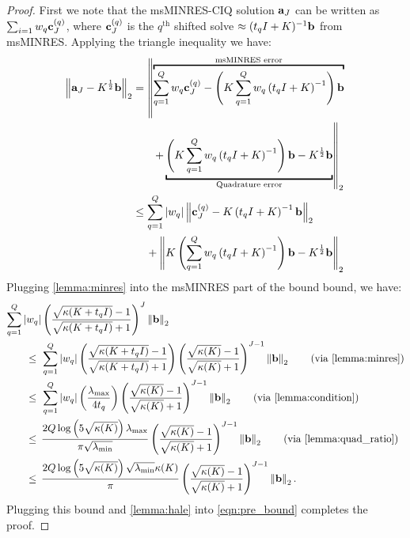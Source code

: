 \begin{proof}
  First we note that the msMINRES-CIQ solution $\mathbf{a}_J$ can be written as $\sum_{i=1} w_q \mathbf{c}^{(q)}_J$, where $\mathbf{c}^{(q)}_J$ is the $q^\text{th}$ shifted solve $\approx (t_q I + K)^{-1} \mathbf{b}$ from msMINRES.
  Applying the triangle inequality we have:
  \begin{align}
    \left\Vert \ba_J - \bK^{\frac 1 2} \bb \right\Vert_2
    &=
    \left\Vert \overbracket{\sum_{q=1}^Q w_q \bc^{(q)}_J - \left( \bK \sum_{q=1}^Q w_q \left( t_q \bI + \bK \right)^{-1} \right) \bb }^{\text{msMINRES error}} \right.
    \nonumber
    \\
    &\phantom{=} \quad \left. + \underbracket{\left( \bK \sum_{q=1}^Q w_q \left( t_q \bI + \bK \right)^{-1} \right) \bb - \bK^{\frac 1 2} \bb}_{\text{Quadrature error}} \right\Vert_2
    \nonumber
    \\
    &\leq \sum_{q=1}^Q \vert w_q \vert \left\Vert \bc^{(q)}_J - \bK \left( t_q \bI + \bK \right)^{-1} \bb \right\Vert_2
    \nonumber
    \\
    &\phantom{=} \:\: + \left\Vert \bK \left( \sum_{q=1}^Q w_q \left( t_q \bI + \bK \right)^{-1} \right) \bb - \bK^{\frac 1 2} \bb \right\Vert_2
    \label{eqn:pre_bound}
  \end{align}
  Plugging \cref{lemma:minres} into the msMINRES part of the bound bound, we have:
  \begin{align*}
    \sum_{q=1}^Q \left\vert w_q \right\vert&
    \left( \frac{ \sqrt{\kappa(\bK + t_q \bI)} - 1}{ \sqrt{\kappa(\bK + t_q \bI)} + 1} \right)^J \left\Vert \bb \right\Vert_2
    \\
    \leq \:\:
    & \sum_{q=1}^Q \left\vert w_q \right\vert
    \left( \frac{ \sqrt{\kappa(\bK + t_q \bI)} - 1}{ \sqrt{\kappa(\bK + t_q \bI)} + 1} \right)
    \left( \frac{ \sqrt{\kappa(\bK)} - 1}{ \sqrt{\kappa(\bK)} + 1} \right)^{J-1}
    \left\Vert \bb \right\Vert_2
    \tag{via \cref{lemma:minres}}
    \\
    \leq \:\:
    & \sum_{q=1}^Q \left\vert w_q \right\vert
    \left( \frac{ \lambda_\text{max} }{ 4 t_q } \right)
    \left( \frac{ \sqrt{\kappa(\bK)} - 1}{ \sqrt{\kappa(\bK)} + 1} \right)^{J-1}
    \left\Vert \bb \right\Vert_2
    \tag{via \cref{lemma:condition}}
    \\
    \leq \:\:
    & \frac{ 2 Q \log \left( 5 \sqrt{\kappa(\bK)} \right) \lambda_\text{max}}{\pi \sqrt{\lambda_\text{min}}}
    \left( \frac{ \sqrt{\kappa(\bK)} - 1}{ \sqrt{\kappa(\bK)} + 1} \right)^{J-1}
    \left\Vert \bb \right\Vert_2
    \tag{via \cref{lemma:quad_ratio}}
    \\
    \leq \:\:
    & \frac{ 2 Q \log \left( 5 \sqrt{\kappa(\bK)} \right) \sqrt{\lambda_{\min}}\kappa(\bK)}{\pi}
    \left( \frac{ \sqrt{\kappa(\bK)} - 1}{ \sqrt{\kappa(\bK)} + 1} \right)^{J-1}
    \left\Vert \bb \right\Vert_2.
  \end{align*}
   Plugging this bound and \cref{lemma:hale} into \cref{eqn:pre_bound} completes the proof.
\end{proof}

